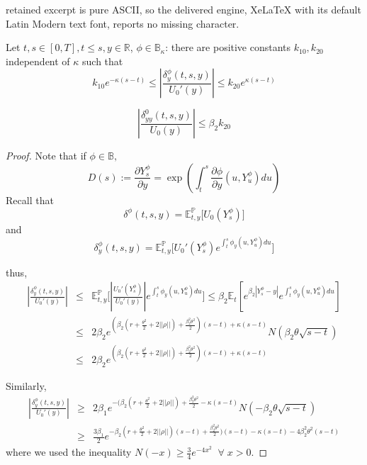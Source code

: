 \documentclass[10pt,a4paper]{amsart}
\def\sE{\mathbb{E}}
\def\sP{\mathbb{P}}
\def\sR{\mathbb{R}}
\newcommand{\be}{\begin{equation}}
\newcommand{\ee}{\end{equation}}
\begin{document}
retained excerpt is pure ASCII, so the delivered engine, XeLaTeX with its default Latin Modern text font, reports no missing character.
\begin{lemma}
Let $t, s \in [0,T], t\leq s, y\in \sR$,  $\phi \in \mathbb{B}_{\kappa}$:
there are positive constants $k_{10}, k_{20}$ independent of $\kappa$ such that
\be
 k_{10}e^{- \kappa(s-t)} \leq | \frac{ \delta_y^{\phi}(t,s,y)}{U_0'(y)}|  \leq  k_{20}e^{ \kappa(s-t)}
\ee

\be 
|\frac{ \delta_{yy}^{0}(t,s,y)}{U_0(y)}|   \leq  \beta_2 k_{20}  
\ee

\end{lemma}

\begin{proof}
Note that if $\phi \in \mathbb{B},$ 
\be
D(s) :=\frac{\partial Y_s^{\phi}}{\partial y} = \exp\left( \int_t^s \frac{ \partial \phi}{\partial y}(u,Y_u^{\phi}) du  \right)
\ee
Recall that $$ \delta^{\phi}(t,s,y) =  \sE_{t,y}^{\sP}\bigg[U_0({Y}^{\phi}_s)\bigg]$$ and
$$ \delta_y^{\phi}(t,s,y) =  \sE_{t,y}^{\sP}\bigg[U_0'({Y}^{\phi}_s)e^{\int_t^s \phi_y(u,Y_u^{\phi})du}\bigg]$$



thus,
\begin{eqnarray*}
| \frac{ \delta_y^{\phi}(t,s,y)}{U_0'(y)} | & \leq &  \sE_{t,y}^{\sP}\bigg[|\frac{U_0'({Y}^{\phi}_s)}{U_0'(y)}| e^{\int_t^s \phi_y(u,Y_u^{\phi})du}\bigg]
\leq  \beta_2\sE_t[ e^{ \beta_2 |Y_s^{\phi} -y | }  e^{\int_t^s \phi_{y} (u, Y_u^{\phi}) du} ] \\
  &\leq &2\beta_2 e^{ (\beta_2 (r+\frac{\theta^2}{2}+2||\rho||) + \frac{\beta_2^2 \theta^2}{2})(s-t)+ \kappa(s-t) }N(\beta_2 \theta\sqrt{s-t}) \\
 &\leq& 2 \beta_2 e^{ (\beta_2 (r+\frac{\theta^2}{2}+2||\rho||) + \frac{\beta_2^2 \theta^2}{2})(s-t)+\kappa (s-t)}
\end{eqnarray*}

Similarly,
\begin{eqnarray*}
| \frac{ \delta_y^{\phi}(t,s,y)}{U_0'(y)} | & \geq & 2\beta_1 e^{ -(\beta_2 (r+\frac{\theta^2}{2}+2||\rho||) + \frac{\beta_2^2 \theta^2}{2}-\kappa (s-t) }  N(-\beta_2 \theta\sqrt{s-t}) \\
 &\geq& \frac{3\beta_1}{2} e^{- \beta_2 (r+\frac{\theta^2}{2}+2||\rho||)(s-t) + \frac{\beta_2^2 \theta^2}{2})(s-t)-\kappa(s-t)-4\beta_2^2\theta^2(s-t)}
 \end{eqnarray*}
 where we used the inequality $N(-x)\geq \frac{3}{4}e^{-4x^2} \;\; \forall \; x>0$.
\end{proof}
\end{document}
